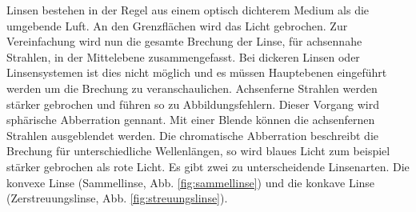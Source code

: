 Linsen bestehen in der Regel aus einem optisch dichterem Medium als die umgebende Luft.
An den Grenzflächen wird das Licht gebrochen.
Zur Vereinfachung wird nun die gesamte Brechung der Linse, für achsennahe Strahlen, in der Mittelebene zusammengefasst.
Bei dickeren Linsen oder Linsensystemen ist dies nicht möglich und es müssen Hauptebenen eingeführt werden um die Brechung zu veranschaulichen.
Achsenferne Strahlen werden stärker gebrochen und führen so zu Abbildungsfehlern. Dieser Vorgang wird sphärische Abberration gennant.
Mit einer Blende können die achsenfernen Strahlen ausgeblendet werden. Die chromatische Abberration beschreibt die Brechung für unterschiedliche Wellenlängen,
so wird blaues Licht zum beispiel stärker gebrochen als rote Licht.
Es gibt zwei zu unterscheidende Linsenarten. Die konvexe Linse (Sammellinse, Abb. \ref{fig:sammellinse}) und die konkave Linse (Zerstreuungslinse, Abb. \ref{fig:streuungslinse}).
